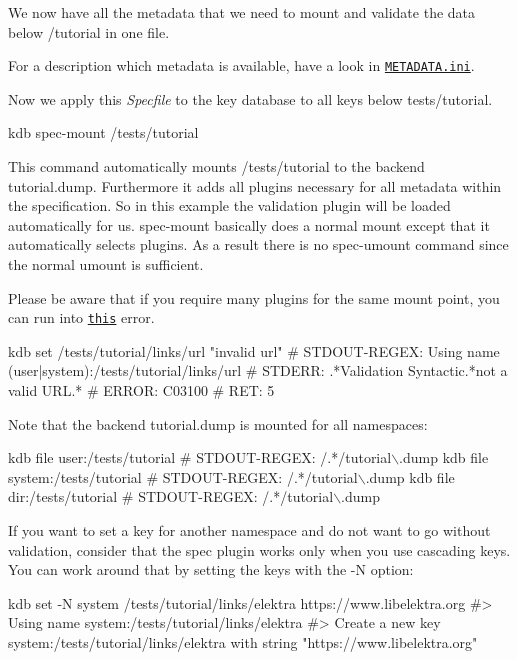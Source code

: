 We now have all the metadata that we need to mount and validate the data below {\ttfamily /tutorial} in one file.

For a description which metadata is available, have a look in \href{/home/jenkins/workspace/libelektra-release/doc/METADATA.ini}{\tt M\+E\+T\+A\+D\+A\+T\+A.\+ini}.

Now we apply this {\itshape Specfile} to the key database to all keys below {\ttfamily tests/tutorial}.


\begin{DoxyCode}
kdb spec-mount /tests/tutorial
\end{DoxyCode}


This command automatically mounts {\ttfamily /tests/tutorial} to the backend {\ttfamily tutorial.\+dump}. Furthermore it adds all plugins necessary for all metadata within the specification. So in this example the validation plugin will be loaded automatically for us. {\ttfamily spec-\/mount} basically does a normal mount except that it automatically selects plugins. As a result there is no {\ttfamily spec-\/umount} command since the normal {\ttfamily umount} is sufficient.

Please be aware that if you require many plugins for the same mount point, you can run into \href{https://github.com/ElektraInitiative/libelektra/issues/2133}{\tt this} error.


\begin{DoxyCode}
kdb set /tests/tutorial/links/url "invalid url"
# STDOUT-REGEX: Using name (user|system):/tests/tutorial/links/url
# STDERR: .*Validation Syntactic.*not a valid URL.*
# ERROR:  C03100
# RET:    5
\end{DoxyCode}


Note that the backend {\ttfamily tutorial.\+dump} is mounted for all namespaces\+:


\begin{DoxyCode}
kdb file user:/tests/tutorial
# STDOUT-REGEX: /.*/tutorial\(\backslash\).dump
kdb file system:/tests/tutorial
# STDOUT-REGEX: /.*/tutorial\(\backslash\).dump
kdb file dir:/tests/tutorial
# STDOUT-REGEX: /.*/tutorial\(\backslash\).dump
\end{DoxyCode}


If you want to set a key for another namespace and do not want to go without validation, consider that the spec plugin works only when you use cascading keys. You can work around that by setting the keys with the {\ttfamily -\/N} option\+:


\begin{DoxyCode}
kdb set -N system /tests/tutorial/links/elektra https://www.libelektra.org
#> Using name system:/tests/tutorial/links/elektra
#> Create a new key system:/tests/tutorial/links/elektra with string "https://www.libelektra.org"
\end{DoxyCode}


